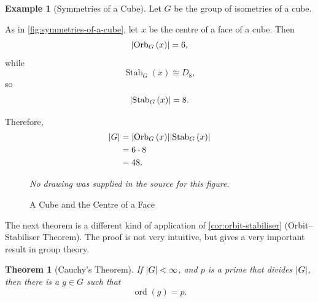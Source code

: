 \documentclass{article}
\newtheorem{theorem}{Theorem}[section]
\theoremstyle{definition}
\newtheorem*{example*}{Example}
\theoremstyle{remark}
\DeclarePairedDelimiter{\abs}{\lvert}{\rvert}
\newcommand{\pqty}[1]{\left(#1\right)}
\newcommand{\isomorphic}{\cong}
\newcommand{\Stab}{\operatorname{Stab}}
\newcommand{\ord}{\operatorname{ord}}
\newcommand{\Orb}{\operatorname{Orb}}
\begin{document}
\begin{example*}[Symmetries of a Cube]
    Let \(G\) be the group of isometries of a cube.

    As in \autoref{fig:symmetries-of-a-cube}, let \(x\) be the centre of a face of a cube. Then
    \[
        \abs{\Orb_{G} \pqty{x}} = 6,
    \]
    while
    \[
        \Stab_{G}\pqty{x} \isomorphic D_8,
    \]
    so
    \[
       \abs{\Stab_{G}\pqty{x}} = 8.
    \]

    Therefore,
    \begin{align*}
        \abs{G} &= \abs{\Orb_{G} \pqty{x}} \abs{\Stab_{G} \pqty{x}} \\
        &= 6 \cdot 8 \\
        &= 48.
    \end{align*}
\end{example*}

\begin{figure}[ht!]
    \centering
    \emph{No drawing was supplied in the source for this figure.}\par
\caption{A Cube and the Centre of a Face}
    \label{fig:symmetries-of-a-cube}
\end{figure}

The next theorem is a different kind of application of \autoref{cor:orbit-stabiliser} (Orbit--Stabiliser Theorem). The proof is not very intuitive, but gives a very important result in group theory.

\begin{theorem}[Cauchy's Theorem]
    \label{thm:cauchy}
    If \(\abs{G} < \infty\), and \(p\) is a prime that divides \(\abs{G}\), then there is a \(g \in G\) such that
    \[
        \ord\pqty{g} = p.
    \]
\end{theorem}
\end{document}
